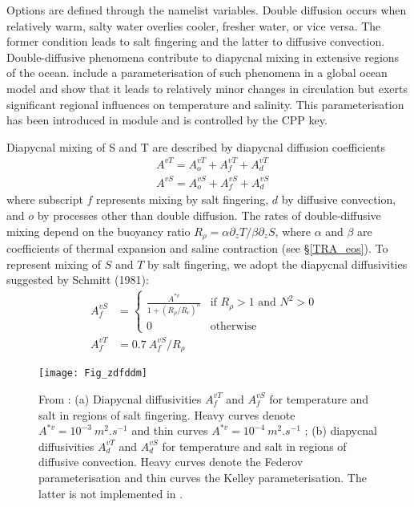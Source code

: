 \documentclass[NEMO_book]{subfiles}
\begin{document}

Options are defined through the   namelist variables.
Double diffusion occurs when relatively warm, salty water overlies cooler, fresher 
water, or vice versa. The former condition leads to salt fingering and the latter 
to diffusive convection. Double-diffusive phenomena contribute to diapycnal 
mixing in extensive regions of the ocean.  \citet{Merryfield1999} include a 
parameterisation of such phenomena in a global ocean model and show that 
it leads to relatively minor changes in circulation but exerts significant regional 
influences on temperature and salinity. This parameterisation has been 
introduced in  module and is controlled by the  CPP key.

Diapycnal mixing of S and T are described by diapycnal diffusion coefficients 
\begin{align*} %
    &A^{vT} = A_o^{vT}+A_f^{vT}+A_d^{vT}	\\
    &A^{vS} = A_o^{vS}+A_f^{vS}+A_d^{vS}
\end{align*}
where subscript $f$ represents mixing by salt fingering, $d$ by diffusive convection, 
and $o$ by processes other than double diffusion. The rates of double-diffusive 
mixing depend on the buoyancy ratio $R_\rho = \alpha \partial_z T / \beta \partial_z S$, 
where $\alpha$ and $\beta$ are coefficients of thermal expansion and saline 
contraction (see \S\ref{TRA_eos}). To represent mixing of $S$ and $T$ by salt 
fingering, we adopt the diapycnal diffusivities suggested by Schmitt (1981):
\begin{align} \label{Eq_zdfddm_f}
A_f^{vS} &= 	\begin{cases}
	\frac{A^{\ast v}}{1+(R_\rho / R_c)^n   } &\text{if  $R_\rho > 1$ and $N^2>0$ } \\
	0 				  					    &\text{otherwise} 
				\end{cases}   
\\ 		    \label{Eq_zdfddm_f_T}
A_f^{vT} &= 0.7 \ A_f^{vS} / R_\rho 
\end{align}

\begin{figure}[!t]   \begin{center}
\texttt{[image: Fig\_zdfddm]}
\caption{  \label{Fig_zdfddm}
From \citet{Merryfield1999} : (a) Diapycnal diffusivities $A_f^{vT}$ 
and $A_f^{vS}$ for temperature and salt in regions of salt fingering. Heavy 
curves denote $A^{\ast v} = 10^{-3}~m^2.s^{-1}$ and thin curves 
$A^{\ast v} = 10^{-4}~m^2.s^{-1}$ ; (b) diapycnal diffusivities $A_d^{vT}$ and 
$A_d^{vS}$ for temperature and salt in regions of diffusive convection. Heavy 
curves denote the Federov parameterisation and thin curves the Kelley 
parameterisation. The latter is not implemented in \NEMO. }
\end{center}    \end{figure}
\end{document}
